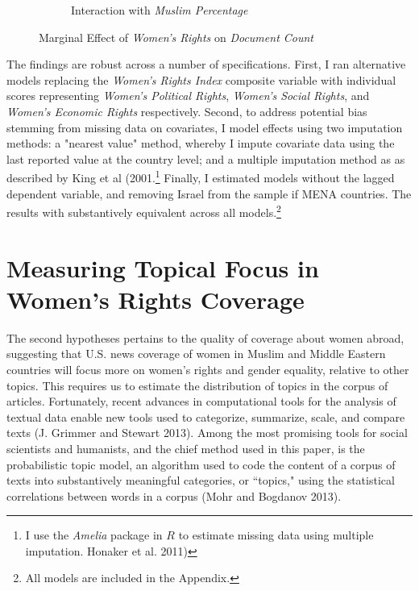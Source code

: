 \documentclass[11pt, oneside]{article}
\begin{document}
\begin{figure}
\begin{subfigure}{.5\textwidth}
    \caption{Interaction with \emph{Muslim Percentage}}
  \label{fig:sfig2}
\end{subfigure}
\vspace{.5cm}
\caption{Marginal Effect of \emph{Women's Rights} on \emph{Document Count}}
\label{fig:fig}
\end{figure}

The findings are robust across a number of specifications. First, I ran alternative models replacing the \emph{Women's Rights Index} composite variable with individual scores representing \emph{Women's Political Rights}, \emph{Women's Social Rights}, and \emph{Women's Economic Rights} respectively. Second, to address potential bias stemming from missing data on covariates, I model effects using two imputation methods: a "nearest value" method, whereby I impute covariate data using the last reported value at the country level; and a multiple imputation method as as described by King et al (2001.\footnote{\hspace{5}I use the \emph{Amelia} package in $R$ to estimate missing data using multiple imputation. Honaker et al. 2011)} Finally, I estimated models without the lagged dependent variable, and removing Israel from the sample if MENA countries. The results with substantively equivalent across all models.\footnote{\hspace{5}All models are included in the Appendix.}

\section{Measuring Topical Focus in Women's Rights Coverage}

The second hypotheses pertains to the quality of coverage about women abroad, suggesting that U.S. news coverage of women in Muslim and Middle Eastern countries will focus more on women's rights and gender equality, relative to other topics. This requires us to estimate the distribution of topics in the corpus of articles. Fortunately, recent advances in computational tools for the analysis of textual data enable new tools used to categorize, summarize, scale, and compare texts (J. Grimmer and Stewart 2013). Among the most promising tools for social scientists and humanists, and the chief method used in this paper, is the probabilistic topic model, an algorithm used to code the content of a corpus of texts into substantively meaningful categories, or ``topics," using the statistical correlations between words in a corpus (Mohr and Bogdanov 2013).
\end{document}
